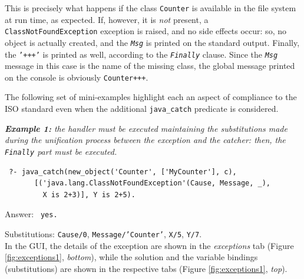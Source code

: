 This is precisely what happens if the class \texttt{Counter} is available in the file system at run time, as expected. If, however, it is \textit{not} present, a \texttt{ClassNotFoundException} exception is raised, and no side effects occur: so, no object is actually created, and the \texttt{\textit{Msg}} is printed on the standard output. Finally, the \texttt{'+++'} is printed as well, according to the \texttt{\textit{Finally}} clause.
Since the \texttt{\textit{Msg}} message in this case is the name of the missing class, the global message printed on the console is obviously \texttt{Counter+++}.

The following set of mini-examples highlight each an aspect of \tuprolog{} compliance to the ISO standard even when the additional \texttt{java\_catch} %
predicate is considered.

\medskip\noindent
\textit{\textbf{Example 1:} the handler must be executed maintaining the substitutions made during the unification process between the exception and the catcher: then, the \texttt{Finally} part must be executed.}
\begin{verbatim}
 ?- java_catch(new_object('Counter', ['MyCounter'], c),
       [('java.lang.ClassNotFoundException'(Cause, Message, _),
         X is 2+3)], Y is 2+5).
\end{verbatim}

Answer: \texttt{ yes.}

Substitutions: \texttt{Cause/0}, \texttt{Message/'Counter'}, \texttt{X/5}, \texttt{Y/7}.\\

\noindent In the \tuprolog{} GUI, the details of the exception are shown in the \textit{exceptions} tab (Figure \ref{fig:exceptions1}, \textit{bottom}), while the solution and the variable bindings (substitutions) are shown in the respective tabs (Figure \ref{fig:exceptions1}, \textit{top}).

